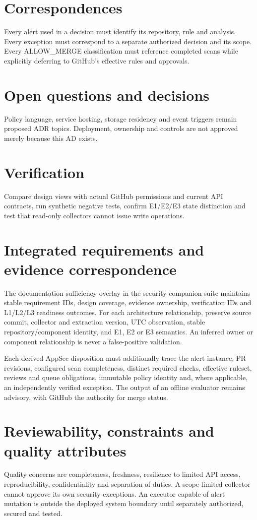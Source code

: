 \documentclass[11pt,letterpaper]{article}
\begin{document}
\section{Correspondences}
Every alert used in a decision must identify its repository, rule and analysis. Every exception must correspond to a separate authorized decision and its scope. Every ALLOW\_MERGE classification must reference completed scans while explicitly deferring to GitHub's effective rules and approvals.


\section{Open questions and decisions}
Policy language, service hosting, storage residency and event triggers remain proposed ADR topics. Deployment, ownership and controls are not approved merely because this AD exists.


\section{Verification}
Compare design views with actual GitHub permissions and current API contracts, run synthetic negative tests, confirm E1/E2/E3 state distinction and test that read-only collectors cannot issue write operations.


\section{Integrated requirements and evidence correspondence}
The documentation sufficiency overlay in the security companion suite maintains stable requirement IDs, design coverage, evidence ownership, verification IDs and L1/L2/L3 readiness outcomes. For each architecture relationship, preserve source commit, collector and extraction version, UTC observation, stable repository/component identity, and E1, E2 or E3 semantics. An inferred owner or component relationship is never a false-positive validation.

Each derived AppSec disposition must additionally trace the alert instance, PR revisions, configured scan completeness, distinct required checks, effective ruleset, reviews and queue obligations, immutable policy identity and, where applicable, an independently verified exception. The output of an offline evaluator remains advisory, with GitHub the authority for merge status.

\section{Reviewability, constraints and quality attributes}
Quality concerns are completeness, freshness, resilience to limited API access, reproducibility, confidentiality and separation of duties. A scope-limited collector cannot approve its own security exceptions. An executor capable of alert mutation is outside the deployed system boundary until separately authorized, secured and tested.
\end{document}
